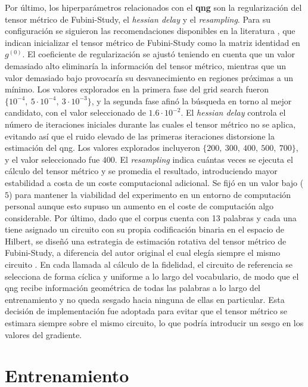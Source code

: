 Por último, los hiperparámetros relacionados con el \textbf{\gls{qng}} son la regularización del tensor métrico de Fubini-Study, el \textit{hessian delay} y el \textit{resampling}. Para su configuración se siguieron las recomendaciones disponibles en la literatura \cite{duan_qnspsa_pennylane_2022}, que indican inicializar el tensor métrico de Fubini-Study como la matriz identidad en $g^{(0)}$. El coeficiente de regularización se ajustó teniendo en cuenta que un valor demasiado alto eliminaría la información del tensor métrico, mientras que un valor demasiado bajo provocaría su desvanecimiento en regiones próximas a un mínimo. Los valores explorados en la primera fase del grid search fueron $\{10^{-4},\ 5 \cdot 10^{-4},\ 3 \cdot 10^{-3}\}$, y la segunda fase afinó la búsqueda en torno al mejor candidato, con el valor seleccionado de $1.6 \cdot 10^{-2}$. El \textit{hessian delay} controla el número de iteraciones iniciales durante las cuales el tensor métrico no se aplica, evitando así que el ruido elevado de las primeras iteraciones distorsione la estimación del \gls{qng}. Los valores explorados incluyeron $\{200,\ 300,\ 400,\ 500,\ 700\}$, y el valor seleccionado fue $400$. El \textit{resampling} indica cuántas veces se ejecuta el cálculo del tensor métrico y se promedia el resultado, introduciendo mayor estabilidad a costa de un coste computacional adicional. Se fijó en un valor bajo ($5$) para mantener la viabilidad del experimento en un entorno de computación personal aunque esto supuso un aumento en el coste de computación algo considerable. Por último, dado que el corpus cuenta con 13 palabras y cada una tiene asignado un circuito con su propia codificación binaria en el espacio de Hilbert, se diseñó una estrategia de estimación rotativa del tensor métrico de Fubini-Study, a diferencia del autor original el cual elegía siempre el mismo circuito \cite{duan_qnspsa_pennylane_2022}. En cada llamada al cálculo de la fidelidad, el circuito de referencia se selecciona de forma cíclica y uniforme a lo largo del vocabulario, de modo que el \gls{qng} recibe información geométrica de todas las palabras a lo largo del entrenamiento y no queda sesgado hacia ninguna de ellas en particular. Esta decisión de implementación fue adoptada para evitar que el tensor métrico se estimara siempre sobre el mismo circuito, lo que podría introducir un sesgo en los valores del gradiente.

\section{Entrenamiento}

